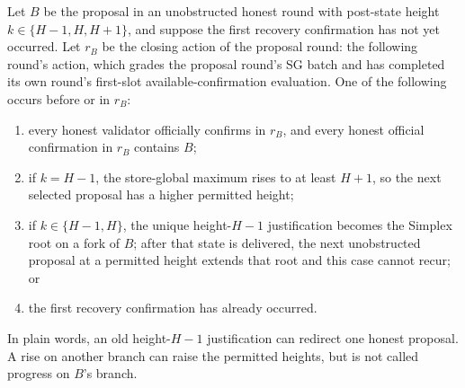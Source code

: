 \begin{lemma}
\label{lem:honest-proposal-confirms}
Let \(B\) be the proposal in an unobstructed honest round with post-state
height \(k\in\{H-1,H,H+1\}\), and suppose the first recovery confirmation has not
yet occurred.  Let \(r_B\) be the closing action of the proposal round: the following
round's action, which grades the proposal round's SG batch and has
completed its own round's first-slot available-confirmation evaluation.  One of the
following occurs before or in \(r_B\):
\begin{enumerate}
 \item every honest validator officially confirms in \(r_B\), and every
   honest official confirmation in \(r_B\) contains \(B\);
 \item if \(k=H-1\), the store-global maximum rises to at least \(H+1\), so
   the next selected proposal has a higher permitted height;
 \item if \(k\in\{H-1,H\}\), the unique height-\(H-1\) justification becomes the
   Simplex root on a fork of \(B\); after that state is delivered, the next
   unobstructed proposal at a permitted height extends that root and this case cannot
   recur;
   or
 \item the first recovery confirmation has already occurred.
\end{enumerate}

In plain words, an old height-\(H-1\) justification can redirect one honest
proposal.  A rise on another branch can raise the permitted heights, but is not
called progress on \(B\)'s branch.
\end{lemma}

